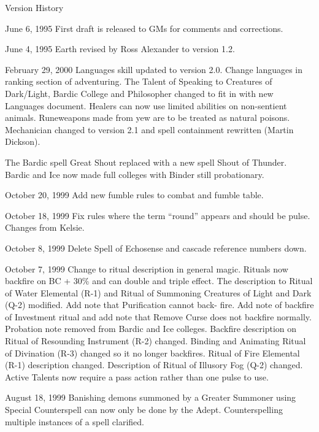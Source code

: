 \begin{Chapter}{Version History}
\begin{Description}
\item[June 6, 1995] First draft is released to GMs for comments and
  corrections.

\item[June 4, 1995] Earth revised by Ross Alexander to version 1.2.


\item[February 29, 2000] Languages skill updated to version 2.0.
  Change languages in ranking section of adventuring.  The Talent of
  Speaking to Creatures of Dark/Light, Bardic College and Philosopher
  changed to fit in with new Languages document.  Healers can now use
  limited abilities on non-sentient animals. Runeweapons made from
  yew are to be treated as natural poisons.  Mechanician changed to
  version 2.1 and spell containment rewritten (Martin Dickson).

  The Bardic spell Great Shout replaced with a new spell Shout of
  Thunder.  Bardic and Ice now made full colleges with Binder still
  probationary.

\item[October 20, 1999] Add new fumble rules to combat and fumble
  table.

\item[October 18, 1999] Fix rules where the term “round” appears and
  should be pulse.  Changes from Kelsie.

\item[October 8, 1999] Delete Spell of Echosense and cascade reference
  numbers down.

\item[October 7, 1999] Change to ritual description in general
  magic. Rituals now backfire on BC + 30\% and can double and triple
  effect. The description to Ritual of Water Elemental (R-1) and
  Ritual of Summoning Creatures of Light and Dark (Q-2) modified.  Add
  note that Purification cannot back- fire. Add note of backfire of
  Investment ritual and add note that Remove Curse does not backfire
  normally. Probation note removed from Bardic and Ice colleges.
  Backfire description on Ritual of Resounding Instrument (R-2)
  changed.  Binding and Animating Ritual of Divination (R-3) changed
  so it no longer backfires.  Ritual of Fire Elemental (R-1)
  description changed. Description of Ritual of Illusory Fog (Q-2)
  changed.  Active Talents now require a pass action rather than one
  pulse to use.

\item[August 18, 1999] Banishing demons summoned by a Greater Summoner
  using Special Counterspell can now only be done by the Adept.
  Counterspelling multiple instances of a spell clarified.


\end{Description}
\end{Chapter}

